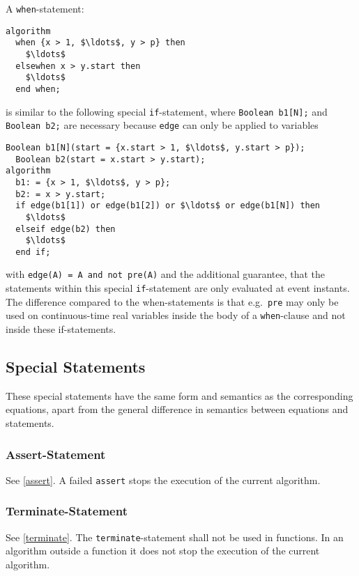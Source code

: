 A \lstinline!when!-statement:
\begin{lstlisting}[language=modelica]
algorithm
  when {x > 1, $\ldots$, y > p} then
    $\ldots$
  elsewhen x > y.start then
    $\ldots$
  end when;
\end{lstlisting}
is similar to the following special \lstinline!if!-statement, where \lstinline!Boolean b1[N];! and \lstinline!Boolean b2;! are necessary because \lstinline!edge! can only be applied to variables
\begin{lstlisting}[language=modelica]
  Boolean b1[N](start = {x.start > 1, $\ldots$, y.start > p});
  Boolean b2(start = x.start > y.start);
algorithm
  b1: = {x > 1, $\ldots$, y > p};
  b2: = x > y.start;
  if edge(b1[1]) or edge(b1[2]) or $\ldots$ or edge(b1[N]) then
    $\ldots$
  elseif edge(b2) then
    $\ldots$
  end if;
\end{lstlisting}
with \lstinline!edge(A) = A and not pre(A)! and the additional guarantee, that the statements within this special \lstinline!if!-statement are only evaluated at event instants.
The difference compared to the when-statements is that e.g.\ \lstinline!pre! may only be used on continuous-time real variables inside the body of a \lstinline!when!-clause and not inside these if-statements.

\subsection{Special Statements}\label{special-statements}

These special statements have the same form and semantics as the corresponding equations, apart from the general difference in semantics between equations and statements.

\subsubsection{Assert-Statement}\label{assert-statement}

See \cref{assert}.
A failed \lstinline!assert! stops the execution of the current algorithm.

\subsubsection{Terminate-Statement}\label{terminate-statement}

See \cref{terminate}.
The \lstinline!terminate!-statement shall not be used in functions.
In an algorithm outside a function it does not stop the execution of the current algorithm.
